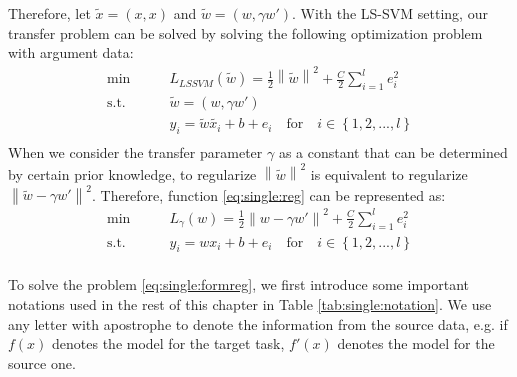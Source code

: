 Therefore, let $\tilde{x} = (x,x)$ and $\tilde{w} = (w,\gamma w')$.
With the LS-SVM setting, our transfer problem can be solved by solving the following optimization problem with argument data:
\begin{equation}\label{eq:single:reg}
	\begin{aligned}
	\min \qquad& L_{LSSVM}(\tilde{w}) = \frac{1}{2}{\left\| \tilde{w} \right\|^2} + \frac{C}{2}\sum\limits_{i = 1}^l {{e_i ^2}}\\
	\text{s.t.}\qquad& \tilde{w} = (w,\gamma w')\\
	&{y_i} = \tilde{w} {\tilde{x_i}} + b + {e _i} \quad   \text{for} \quad i \in \left\{ {1,2,...,l} \right\}\\
	\end{aligned}
\end{equation}
When we consider the transfer parameter $\gamma$ as a constant that can be determined by certain prior knowledge, to regularize  $\left\|\tilde{w}\right\|^2$ is equivalent to regularize $\left\|\tilde{w}-\gamma w'\right\|^2$. Therefore, function \eqref{eq:single:reg} can be represented as:
\begin{equation}\label{eq:single:formreg}
\begin{aligned}
\min \qquad& L_{\gamma}(w) = \frac{1}{2}{\left\| {w}-\gamma w' \right\|^2} + \frac{C}{2}\sum\limits_{i = 1}^l {{e_i ^2}}\\
\text{s.t.}\qquad& {y_i} = {w} {{x_i}} + b + {e _i} \quad   \text{for} \quad i \in \left\{ {1,2,...,l} \right\}\\
\end{aligned}
\end{equation}

To solve the problem \eqref{eq:single:formreg}, we first introduce some important notations used in the rest of this chapter in Table \ref{tab:single:notation}. We use any letter with apostrophe to denote the information from the source data, e.g. if $f(x)$ denotes the model for the target task, $f'(x)$ denotes the model for the source one.

